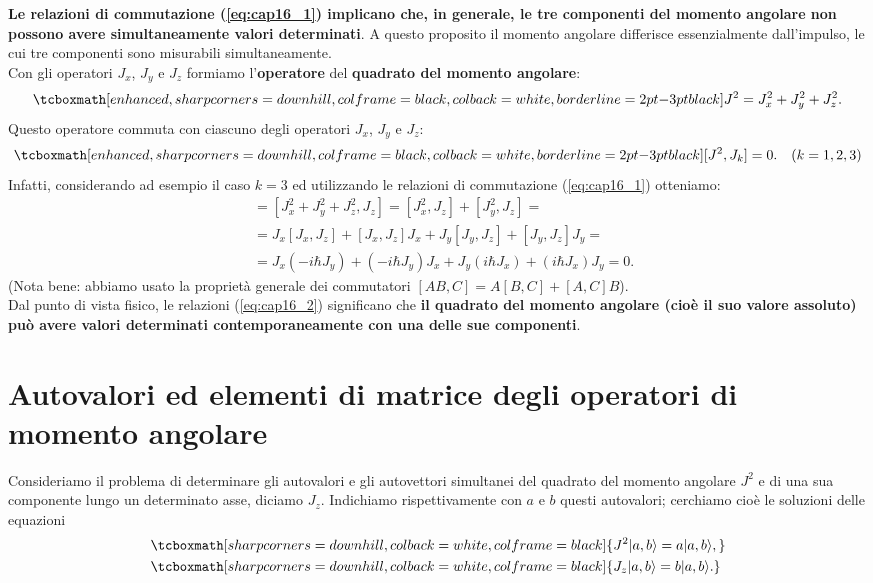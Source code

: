 \textbf{Le relazioni di commutazione (\ref{eq:cap16_1}) implicano che, in generale, le tre componenti del momento angolare non possono avere simultaneamente valori determinati}. A questo proposito il momento angolare differisce essenzialmente dall'impulso, le cui tre componenti sono misurabili simultaneamente.\\
		
Con gli operatori $J_x$, $J_y$ e $J_z$ formiamo l'\textbf{operatore} del \textbf{quadrato del momento angolare}:
	\begin{equation}
		\tcboxmath[enhanced, sharp corners=downhill, colframe=black, colback=white, borderline={2pt}{-3pt}{black}]{
			J^2 = J_x ^2 + J_y ^2 + J_z ^2.
			}
	\end{equation}
Questo operatore commuta con ciascuno degli operatori $J_x$, $J_y$ e $J_z$:
	\begin{equation}
		\tcboxmath[enhanced, sharp corners=downhill, colframe=black, colback=white, borderline={2pt}{-3pt}{black}]{
			[J^2, J_k]=0.
			} \quad (k=1,2,3)
	\label{eq:cap16_2}
	\end{equation}
Infatti, considerando ad esempio il caso $k=3$ ed utilizzando le relazioni di commutazione (\ref{eq:cap16_1}) otteniamo:
	\begin{align}
		[J^2, J_z] &= [J_x ^2+J_y^2+J_z ^2, J_z] = [J_x ^2, J_z]+[J_y ^2, J_z]= \nonumber \\
	& = J_x[J_x, J_z]+[J_x, J_z]J_x+J_y[J_y, J_z]+[J_y, J_z]J_y =  \nonumber \\
	& =  J_x (-i\hbar J_y)+ (-i\hbar J_y)J_x+ J_y (i\hbar J_x)+(i\hbar J_x)J_y =  0.  
	\end{align}
(Nota bene: abbiamo usato la proprietà generale dei commutatori $[AB,C]=A[B,C]+[A,C]B$).\\

Dal punto di vista fisico, le relazioni (\ref{eq:cap16_2}) significano che \textbf{il quadrato del momento angolare (cioè il suo valore assoluto) può avere valori determinati contemporaneamente con una delle sue componenti}.
\section[Autovalori ed elementi di matrice degli operatori di momento angolare]{Autovalori ed elementi di matrice degli operatori di momento angolare}
Consideriamo il problema di determinare gli autovalori e gli autovettori simultanei del quadrato del momento angolare $J^2$ e di una sua componente lungo un determinato asse, diciamo $J_z$. Indichiamo rispettivamente con $a$ e $b$ questi autovalori;  cerchiamo cioè le soluzioni delle equazioni
	\begin{align}
		&\tcboxmath[sharp corners=downhill, colback=white, colframe=black]{ J^2 \vert a, b \rangle = a \vert a, b \rangle ,} \\
		& \tcboxmath[sharp corners=downhill, colback=white, colframe=black]{ J_z \vert a, b \rangle = b \vert a, b \rangle .}
	\end{align}\\
	
